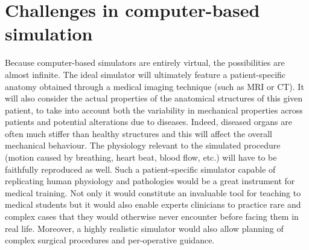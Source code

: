 \section{Challenges in computer-based simulation}

Because computer-based simulators are entirely virtual, the possibilities are almost infinite. The ideal simulator will ultimately feature a patient-specific anatomy obtained through a medical imaging technique (such as MRI or CT). It will also consider the actual properties of the anatomical structures of this given patient, to take into account both the variability in mechanical properties across patients and potential alterations due to diseases. Indeed, diseased organs are often much stiffer than healthy structures and this will affect the overall mechanical behaviour. The physiology relevant to the simulated procedure (motion caused by breathing, heart beat, blood flow, etc.) will have to be faithfully reproduced as well. Such a patient-specific simulator capable of replicating human physiology and pathologies would be a great instrument for medical training. Not only it would constitute an invaluable tool for teaching to medical students but it would also enable experts clinicians to practice rare and complex cases that they would otherwise never encounter before facing them in real life. Moreover, a highly realistic simulator would also allow planning of complex surgical procedures and per-operative guidance.

